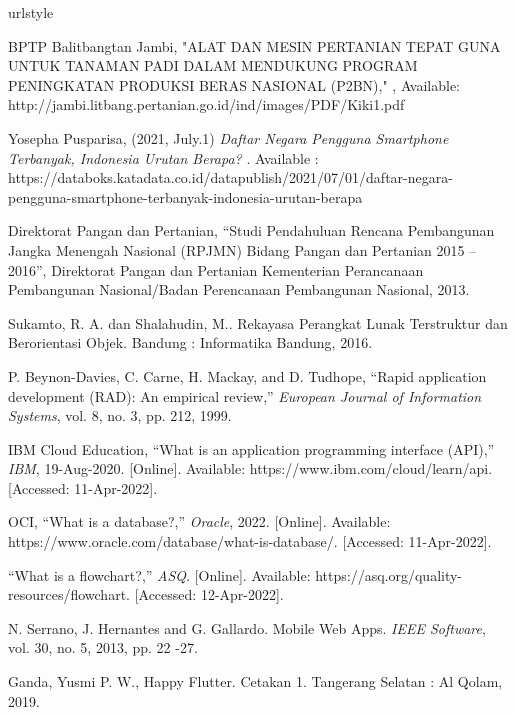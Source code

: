 \begin{thebibliography}{7}
%
\providecommand{\natexlab}[1]{#1}
\providecommand{\url}[1]{\texttt{#1}}
\expandafter\ifx\csname urlstyle\endcsname\relax
  \providecommand{\doi}[1]{doi: #1}\else
  \providecommand{\doi}{doi: \begingroup \urlstyle{rm}\Url}\fi


BPTP Balitbangtan Jambi,
\newblock "ALAT DAN MESIN PERTANIAN TEPAT GUNA
UNTUK TANAMAN PADI DALAM MENDUKUNG PROGRAM
PENINGKATAN PRODUKSI BERAS NASIONAL (P2BN),"
, Available: http://jambi.litbang.pertanian.go.id/ind/images/PDF/Kiki1.pdf

Yosepha Pusparisa, (2021, July.1)
\newblock \emph{Daftar Negara Pengguna Smartphone Terbanyak, Indonesia Urutan Berapa?}
\newblock [Online]. Available : https://databoks.katadata.co.id/datapublish/2021/07/01/daftar-negara-pengguna-smartphone-terbanyak-indonesia-urutan-berapa

Direktorat Pangan dan Pertanian, “Studi Pendahuluan Rencana Pembangunan Jangka Menengah Nasional (RPJMN) Bidang Pangan dan Pertanian 2015 – 2016”, Direktorat Pangan dan Pertanian Kementerian Perancanaan Pembangunan Nasional/Badan Perencanaan Pembangunan Nasional, 2013.

Sukamto, R. A. dan Shalahudin, M.. Rekayasa Perangkat Lunak Terstruktur dan Berorientasi Objek. Bandung : Informatika Bandung, 2016.

P. Beynon-Davies, C. Carne, H. Mackay, and D. Tudhope, “Rapid application development (RAD): An empirical review,” \emph{European Journal of Information Systems}, vol. 8, no. 3, pp. 212, 1999. 

IBM Cloud Education, “What is an application programming interface (API),” \emph{IBM}, 19-Aug-2020. [Online]. Available: https://www.ibm.com/cloud/learn/api. [Accessed: 11-Apr-2022]. 

OCI, “What is a database?,” \emph{Oracle}, 2022. [Online]. Available: https://www.oracle.com/database/what-is-database/. [Accessed: 11-Apr-2022]. 

“What is a flowchart?,” \emph{ASQ}. [Online]. Available: https://asq.org/quality-resources/flowchart. [Accessed: 12-Apr-2022]. 

N. Serrano, J. Hernantes and G. Gallardo. Mobile Web Apps. \emph{IEEE Software}, vol. 30, no. 5, 2013, pp. 22 -27.

Ganda, Yusmi P. W., Happy Flutter. Cetakan 1. Tangerang Selatan : Al Qolam, 2019.

\end{thebibliography}

